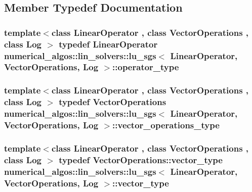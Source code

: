 \subsection{Member Typedef Documentation}
\hypertarget{classnumerical__algos_1_1lin__solvers_1_1lu__sgs_aa14a4c02a91393066a7582cb5e138e2c}{
\subsubsection[{operator\-\_\-type}]{\setlength{\rightskip}{0pt plus 5cm}template$<$class Linear\-Operator , class Vector\-Operations , class Log $>$ typedef Linear\-Operator {\bf numerical\-\_\-algos\-::lin\-\_\-solvers\-::lu\-\_\-sgs}$<$ Linear\-Operator, Vector\-Operations, Log $>$\-::{\bf operator\-\_\-type}}}\label{classnumerical__algos_1_1lin__solvers_1_1lu__sgs_aa14a4c02a91393066a7582cb5e138e2c}
\hypertarget{classnumerical__algos_1_1lin__solvers_1_1lu__sgs_ac92691bd7442a226c10fab88f4f5fd0d}{
\subsubsection[{vector\-\_\-operations\-\_\-type}]{\setlength{\rightskip}{0pt plus 5cm}template$<$class Linear\-Operator , class Vector\-Operations , class Log $>$ typedef Vector\-Operations {\bf numerical\-\_\-algos\-::lin\-\_\-solvers\-::lu\-\_\-sgs}$<$ Linear\-Operator, Vector\-Operations, Log $>$\-::{\bf vector\-\_\-operations\-\_\-type}}}\label{classnumerical__algos_1_1lin__solvers_1_1lu__sgs_ac92691bd7442a226c10fab88f4f5fd0d}
\hypertarget{classnumerical__algos_1_1lin__solvers_1_1lu__sgs_ac04dfa258dce932c55628e33aa5cf09e}{
\subsubsection[{vector\-\_\-type}]{\setlength{\rightskip}{0pt plus 5cm}template$<$class Linear\-Operator , class Vector\-Operations , class Log $>$ typedef Vector\-Operations\-::vector\-\_\-type {\bf numerical\-\_\-algos\-::lin\-\_\-solvers\-::lu\-\_\-sgs}$<$ Linear\-Operator, Vector\-Operations, Log $>$\-::{\bf vector\-\_\-type}}}\label{classnumerical__algos_1_1lin__solvers_1_1lu__sgs_ac04dfa258dce932c55628e33aa5cf09e}


